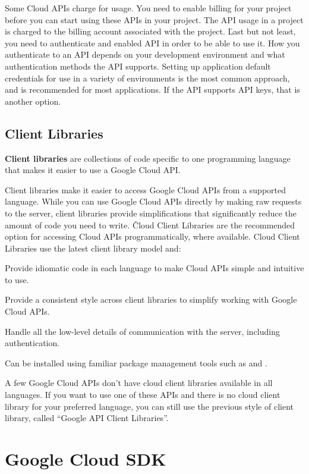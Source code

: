 Some Cloud APIs charge for usage. You need to enable billing for your project before you can start using these APIs
in your project. The API usage in a project is charged to the billing account associated with the project. \v

Last but not least, you need to authenticate and enabled API in order to be able to use it. How you authenticate to
an API depends on your development environment and what authentication methods the API supports. Setting up
application default credentials for use in a variety of environments is the most common approach, and is recommended
for most applications. If the API supports API keys, that is another option.

\subsection{Client Libraries}

\textbf{Client libraries} are collections of code specific to one programming language that makes it easier to use a
Google Cloud API.
\ed

Client libraries make it easier to access Google Cloud APIs from a supported language. While you can use Google Cloud
APIs directly by making raw requests to the server, client libraries provide simplifications that significantly
reduce the amount of code you need to write. \v

Cloud Client Libraries are the recommended option for accessing Cloud APIs programmatically, where available. Cloud
Client Libraries use the latest client library model and:
\bit
\item Provide idiomatic code in each language to make Cloud APIs simple and intuitive to use.
\item Provide a consistent style across client libraries to simplify working with Google Cloud APIs.
\item Handle all the low-level details of communication with the server, including authentication.
\item Can be installed using familiar package management tools such as  and .
\eit

A few Google Cloud APIs don't have cloud client libraries available in all languages. If you want to use one
of these APIs and there is no cloud client library for your preferred language, you can still use the previous style
of client library, called ``Google API Client Libraries''.

\section{Google Cloud SDK}

